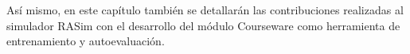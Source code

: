 Así mismo, en este capítulo también se detallarán las contribuciones realizadas al simulador \ac{RASim} con el desarrollo del módulo \ac{Courseware} como herramienta de entrenamiento y autoevaluación.










